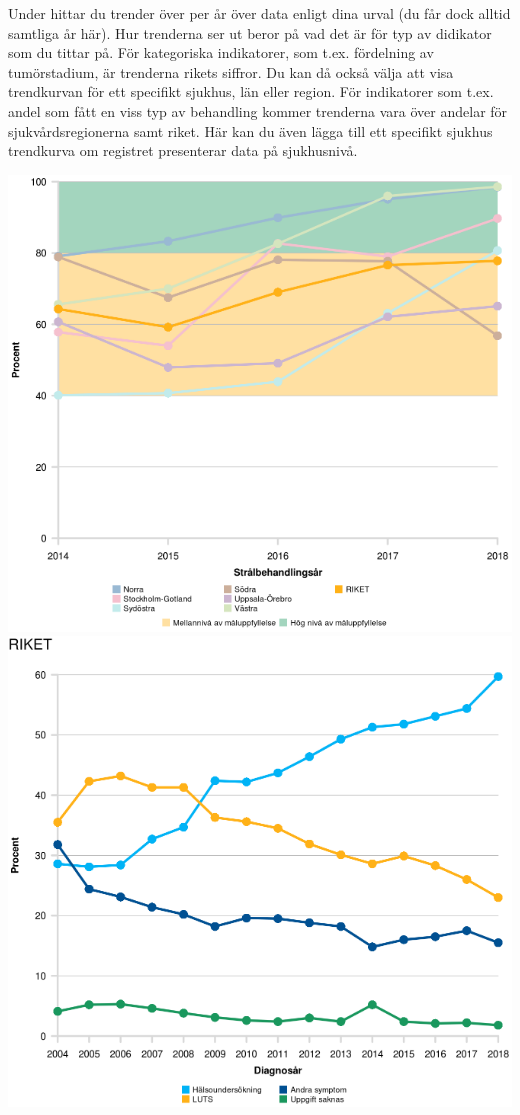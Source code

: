 \documentclass[10pt, a4paper,twoside]{report}
\begin{document}
Under \textcolor{useblue}{\selectfont{Trend}} hittar du trender över per år över data enligt dina urval (du får dock alltid samtliga år här). Hur trenderna ser ut beror på vad det är för typ av didikator som du tittar på. För kategoriska indikatorer, som t.ex. fördelning av tumörstadium, är trenderna rikets siffror. Du kan då också välja att visa trendkurvan för ett specifikt sjukhus, län eller region. \newline
För indikatorer som t.ex. andel som fått en viss typ av behandling kommer trenderna vara över andelar för sjukvårdsregionerna samt riket. Här kan du även lägga till ett specifikt sjukhus trendkurva om registret presenterar data på sjukhusnivå.

\includegraphics[]{figurer/Trend1}
\includegraphics[]{figurer/Trend2}
\newline
\clearpage
\end{document}
